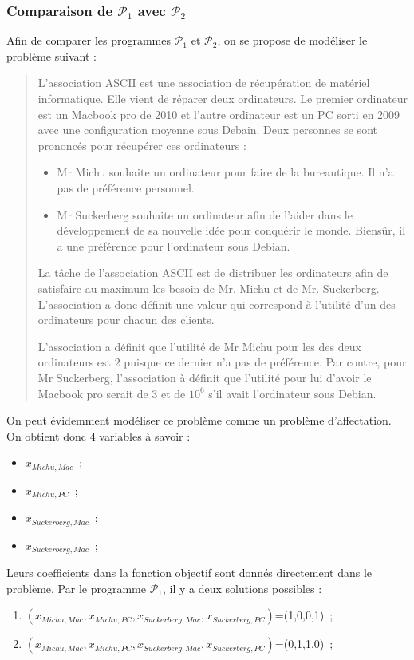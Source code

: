 \documentclass[a4paper, titlepage, oneside, 12pt]{article}%
\begin{document}
\subsubsection{Comparaison de $\mathcal{P}_1$ avec $\mathcal{P}_2$}

Afin de comparer les programmes $\mathcal{P}_1$ et $\mathcal{P}_2$, on se propose de modéliser le problème suivant :
\begin{quote}
L'association ASCII est une association de récupération de matériel informatique. Elle vient de réparer deux ordinateurs. Le premier ordinateur est un Macbook pro de 2010 et l'autre ordinateur est un PC sorti en 2009 avec une configuration moyenne sous Debain. Deux personnes se sont prononcés pour récupérer ces ordinateurs :
\begin{itemize}
\item Mr Michu souhaite un ordinateur pour faire de la bureautique. Il n'a pas de préférence personnel.
\item Mr Suckerberg souhaite un ordinateur afin de l'aider dans le développement de sa nouvelle idée pour conquérir le monde. Biensûr, il a une préférence pour l'ordinateur sous Debian.
\end{itemize}

La tâche de l'association ASCII est de distribuer les ordinateurs afin de satisfaire au maximum les besoin de Mr. Michu et de Mr. Suckerberg. L'association a donc définit une valeur qui correspond à l'utilité d'un des ordinateurs pour chacun des clients.

L'association a définit que l'utilité de Mr Michu pour les des deux ordinateurs est $2$ puisque ce dernier n'a pas de préférence.
Par contre, pour Mr Suckerberg, l'association à définit que l'utilité pour lui d'avoir le Macbook pro serait de $3$ et de $10^6$ s'il avait l'ordinateur sous Debian. 
\end{quote}

On peut évidemment modéliser ce problème comme un problème d'affectation. On obtient donc $4$ variables à savoir :
\begin{itemize}
\item $x_{Michu, Mac}$~;
\item $x_{Michu, PC}$~;
\item $x_{Suckerberg, Mac}$~;
\item $x_{Suckerberg, Mac}$~;
\end{itemize}

Leurs coefficients dans la fonction objectif sont donnés directement dans le problème. Par le programme $\mathcal{P}_1$, il y a deux solutions possibles : 
\begin{enumerate}
\item $(x_{Michu, Mac},x_{Michu, PC},x_{Suckerberg, Mac},x_{Suckerberg, PC})$=(1,0,0,1)~;
\item $(x_{Michu, Mac},x_{Michu, PC},x_{Suckerberg, Mac},x_{Suckerberg, PC})$=(0,1,1,0)~;
\end{enumerate}
\end{document}
